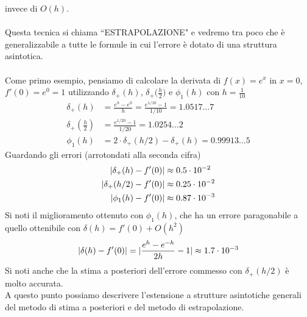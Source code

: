 invece di $O(h)$.\\
\vspace{0.1cm}\\
Questa tecnica si chiama ``ESTRAPOLAZIONE" e vedremo tra poco che è generalizzabile a tutte le formule in cui l'errore è dotato di una struttura asintotica.\\
\vspace{0.1cm}\\
Come primo esempio, pensiamo di calcolare la derivata di $f(x)=e^x$ in $x=0$, $f'(0)=e^0=1$ utilizzando $\delta_+(h)$, $\delta_+\bigl(\frac{h}{2}\bigr)$ e $\phi_1(h)$ con $h=\frac{1}{10}$
\[
\begin{split}
    \delta_+ (h) & = \frac{e^h - e^0}{h} = \frac{e^{1/10} - 1}{1/10} = 1.0517 \dotso 7 \\
    \delta_+ (\frac{h}{2}) & = \frac{e^{1/20} - 1}{1/20} = 1.0254 \dotso 2 \\
    \phi_1 (h) & = 2 \cdot \delta_+ (h/2) - \delta_+ (h) = 0.99913 \dotso 5
\end{split}
\]
Guardando gli errori (arrotondati alla seconda cifra)
\[
\begin{split}
    \lvert\delta_+ (h) - f'(0)\rvert & \approx 0.5 \cdot 10^{-2} \\
    \lvert\delta_+ (h/2) - f'(0)\rvert & \approx 0.25 \cdot 10^{-2} \\
    \lvert\phi_1 (h) - f'(0)\rvert & \approx 0.87 \cdot 10^{-3}
\end{split}
\]
Si noti il miglioramento ottenuto con $\phi_1 (h)$, che ha un
errore paragonabile a quello ottenibile con $\delta (h) = f'(0) + O(h^2)$
\[
\lvert\delta (h) - f'(0)\rvert = \lvert\frac{e^h - e^{-h}}{2h} - 1\rvert \approx 1.7 \cdot 10^{-3}
\]
Si noti anche che la stima a posteriori dell'errore commesso con $\delta_+ (h/2)$ è molto accurata.\\
A questo punto possiamo descrivere l'estensione a strutture asintotiche generali del metodo di stima a posteriori e del metodo di estrapolazione.\\

